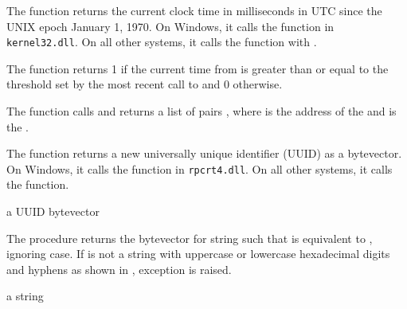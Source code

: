 The  function returns the current clock time in
milliseconds in UTC since the UNIX epoch January 1, 1970. On Windows,
it calls the  function in
\texttt{kernel32.dll}. On all other systems, it calls the
 function with .

\begin{function}
\end{function}

The  function returns 1 if the current time
from  is greater than or equal to the threshold set
by the most recent call to  and 0 otherwise.

\begin{function}
\end{function}

The  function calls  and
returns a list of pairs , where
 is the address of the  and 
is the .

\begin{function}
\end{function}

The  function returns a new universally unique
identifier (UUID) as a bytevector. On Windows, it calls the
 function in \texttt{rpcrt4.dll}. On all other
systems, it calls the  function.

\begin{procedure}
\end{procedure}
\returns{} a UUID bytevector

The  procedure returns the bytevector 
for string  such that  is
equivalent to , ignoring case. If  is not a string with
uppercase or lowercase hexadecimal digits and hyphens as shown in
, exception 
is raised.

\begin{procedure}
\end{procedure}
\returns{} a string

